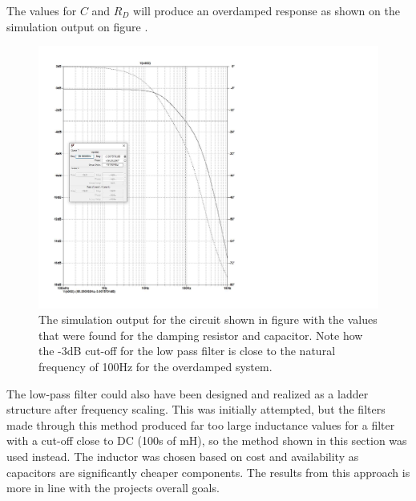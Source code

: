 The values for $C$ and $R_D$ will produce an overdamped response as shown on the simulation output on figure .
\begin{figure}[H]
    \centering
    \includegraphics[clip, trim=0 0 275 0, width=1\textwidth]{Sections/7_SystemDesign/Figures/7_1_5_SupplyFilterSimPlot.pdf}
    \caption{The simulation output for the circuit shown in figure  with the values that were found for the damping resistor and capacitor. Note how the -3dB cut-off for the low pass filter is close to the natural frequency of 100Hz for the overdamped system.}
    \label{fig_7_1_5_SupplyFilterSimOut}
\end{figure}

 The low-pass filter could also have been designed and realized as a ladder structure after frequency scaling. This was initially attempted, but the filters made through this method produced far too large inductance values for a filter with a cut-off close to DC (100s of mH), so the method shown in this section was used instead. The inductor was chosen based on cost and availability as capacitors are significantly cheaper components. The results from this approach is more in line with the projects overall goals.